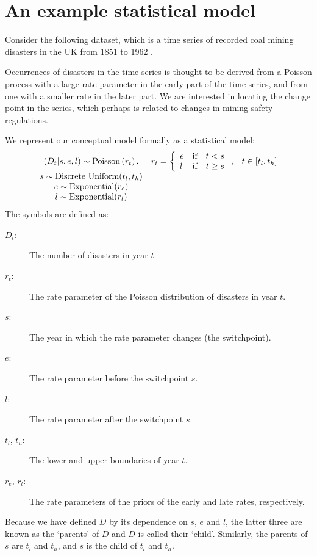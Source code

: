 
\section{An example statistical model}
Consider the following dataset, which is a time series of recorded coal mining disasters in the UK from 1851 to 1962 \citep{Jarrett:1979fr}.
\begin{center}
\end{center}
Occurrences of disasters in the time series is thought to be derived from a Poisson process with a large rate parameter in the early part of the time series, and from one with a smaller rate in the later part. We are interested in locating the change point in the series, which perhaps is related to changes in mining safety regulations.

We represent our conceptual model formally as a statistical model:
\begin{equation}
    \begin{array}{ccc}
        (D_t | s, e, l) \sim \textup{Poisson}\left(r_t\right), & r_t=\left\{\begin{array}{lll}
            e &\textup{if}& t< s\\ l &\textup{if}& t\ge s
            \end{array}\right.,&t\in[t_l,t_h]\\
        s\sim \textup{Discrete Uniform}(t_l, t_h)\\
        e\sim \textup{Exponential}(r_e)\\
        l\sim \textup{Exponential}(r_l)        
    \end{array}
    \label{disastermodel} 
\end{equation}
The symbols are defined as:
\begin{description}
    \item[$D_t$:] The number of disasters in year $t$.
    \item[$r_t$:] The rate parameter of the Poisson distribution of disasters in year $t$.
    \item[$s$:] The year in which the rate parameter changes (the switchpoint).
    \item[$e$:] The rate parameter before the switchpoint $s$.
    \item[$l$:] The rate parameter after the switchpoint $s$.
    \item[$t_l$, $t_h$:] The lower and upper boundaries of year $t$.
    \item[$r_e$, $r_l$:] The rate parameters of the priors of the early and late rates, respectively.
\end{description}
Because we have defined $D$ by its dependence on $s$, $e$ and $l$, the latter three are known as the `parents' of $D$ and $D$ is called their `child'. Similarly, the parents of $s$ are $t_l$ and $t_h$, and $s$ is the child of $t_l$ and $t_h$.

